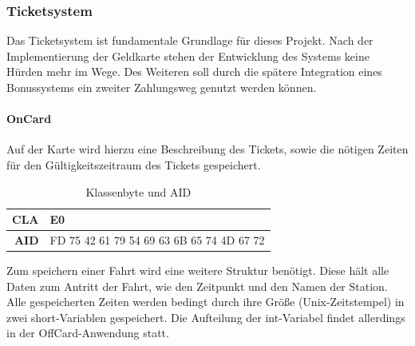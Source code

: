 \documentclass[	a4paper,
			11pt,
			oneside,
			parskip]{scrartcl}
\begin{document}
\subsubsection{Ticketsystem}

Das Ticketsystem ist fundamentale Grundlage für dieses Projekt. Nach der Implementierung der Geldkarte stehen der Entwicklung des Systems keine Hürden mehr im Wege. Des Weiteren soll durch die spätere Integration eines Bonussystems ein zweiter Zahlungsweg genutzt werden können. 

\paragraph{OnCard} Auf der Karte wird hierzu eine Beschreibung des Tickets, sowie die nötigen Zeiten für den Gültigkeitszeitraum des Tickets gespeichert.

\begin{table}[htbp]
  \centering
  \caption{Klassenbyte und AID}
    \begin{tabular}{rr}
    \toprule
    \textbf{CLA} & \multicolumn{1}{l}{E0} \\
    \midrule
    \textbf{AID} & FD 75 42 61 79 54 69 63 6B 65 74 4D 67 72 \\
    \bottomrule
    \end{tabular}%
  \label{tab:ticketaid}%
\end{table}%

Zum speichern einer Fahrt wird eine weitere Struktur benötigt. Diese hält alle Daten zum Antritt der Fahrt, wie den Zeitpunkt und den Namen der Station. Alle gespeicherten Zeiten werden bedingt durch ihre Größe (Unix-Zeitstempel) in zwei short-Variablen gespeichert. Die Aufteilung der int-Variabel findet allerdings in der OffCard-Anwendung statt.
\end{document}
